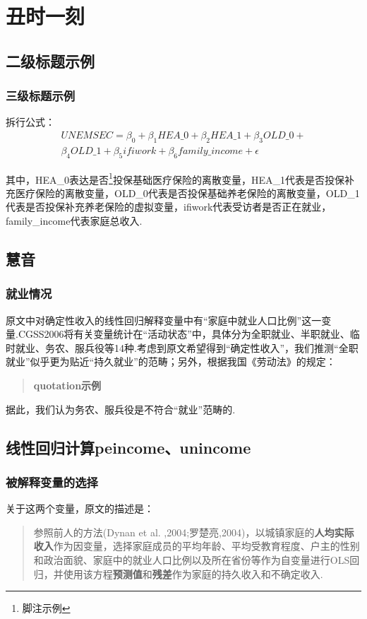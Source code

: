 \documentclass[a4paper,12pt]{report}
\begin{document}
\chapter{丑时一刻}
\section{二级标题示例}
\subsection{三级标题示例}
拆行公式：
\begin{equation*}
\begin{split}
   UNEMSEC = \beta_0 + \beta_1HEA\_0 + \beta_2HEA\_1 + \beta_3OLD\_0 +  \\
     \beta_4OLD\_1 + \beta_5ifiwork + \beta_6family\_income + \epsilon
\end{split}
\end{equation*}

其中，HEA\_0表达是否\footnote{脚注示例}投保基础医疗保险的离散变量，HEA\_1代表是否投保补充医疗保险的离散变量，OLD\_0代表是否投保基础养老保险的离散变量，OLD\_1代表是否投保补充养老保险的虚拟变量，ifiwork代表受访者是否正在就业，family\_income代表家庭总收入.



\section{慧音}
\subsection{就业情况}
原文中对确定性收入的线性回归解释变量中有“家庭中就业人口比例”这一变量.CGSS2006将有关变量统计在“活动状态”中，具体分为全职就业、半职就业、临时就业、务农、服兵役等14种.考虑到原文希望得到“确定性收入”，我们推测“全职就业”似乎更为贴近“持久就业”的范畴；另外，根据我国《劳动法》的规定：
\begin{quotation}
  \textbf{quotation示例}
\end{quotation}

据此，我们认为务农、服兵役是不符合“就业”范畴的.


\section{线性回归计算peincome、unincome}
\subsection{被解释变量的选择}
关于这两个变量，原文的描述是：
\begin{quotation}
  参照前人的方法(Dynan et al. ,2004;罗楚亮,2004)，以城镇家庭的\textbf{人均实际收入}作为因变量，选择家庭成员的平均年龄、平均受教育程度、户主的性别和政治面貌、家庭中的就业人口比例以及所在省份等作为自变量进行OLS回归，并使用该方程\textbf{预测值}和\textbf{残差}作为家庭的持久收入和不确定收入.
\end{quotation}
\end{document}
